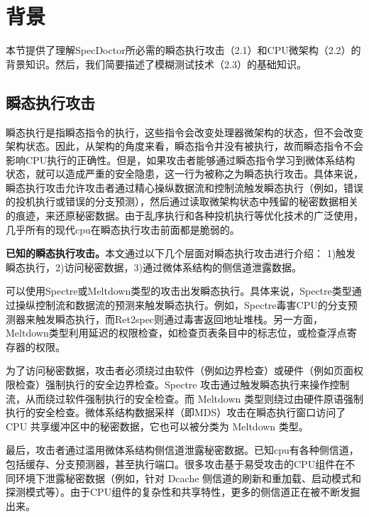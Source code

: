\section{背景}

本节提供了理解SpecDoctor所必需的瞬态执行攻击（2.1）和CPU微架构（2.2）的背景知识。然后，我们简要描述了模糊测试技术（2.3）的基础知识。

\subsection{瞬态执行攻击}

瞬态执行是指瞬态指令的执行，这些指令会改变处理器微架构的状态，但不会改变架构状态。因此，从架构的角度来看，瞬态指令并没有被执行，故而瞬态指令不会影响CPU执行的正确性。但是，如果攻击者能够通过瞬态指令学习到微体系结构状态，就可以造成严重的安全隐患，这一行为被称之为瞬态执行攻击。具体来说，瞬态执行攻击允许攻击者通过精心操纵数据流和控制流触发瞬态执行（例如，错误的投机执行或错误的分支预测），然后通过读取微架构状态中残留的秘密数据相关的痕迹，来还原秘密数据。由于乱序执行和各种投机执行等优化技术的广泛使用，几乎所有的现代cpu在瞬态执行攻击前面都是脆弱的。\par

\textbf{已知的瞬态执行攻击。}本文通过以下几个层面对瞬态执行攻击进行介绍： 1)触发瞬态执行，2)访问秘密数据，3)通过微体系结构的侧信道泄露数据。\par

可以使用Spectre或Meltdown类型的攻击出发瞬态执行。具体来说，Spectre类型通过操纵控制流和数据流的预测来触发瞬态执行。例如，Spectre毒害CPU的分支预测器来触发瞬态执行，而Ret2spec则通过毒害返回地址堆栈。另一方面，Meltdown类型利用延迟的权限检查，如检查页表条目中的标志位，或检查浮点寄存器的权限。\par

为了访问秘密数据，攻击者必须绕过由软件（例如边界检查）或硬件（例如页面权限检查）强制执行的安全边界检查。Spectre 攻击通过触发瞬态执行来操作控制流，从而绕过软件强制执行的安全检查。而 Meltdown 类型则绕过由硬件原语强制执行的安全检查。微体系结构数据采样（即MDS）攻击在瞬态执行窗口访问了 CPU 共享缓冲区中的秘密数据，它也可以被分类为 Meltdown 类型。\par

最后，攻击者通过滥用微体系结构侧信道泄露秘密数据。已知cpu有各种侧信道，包括缓存、分支预测器，甚至执行端口。很多攻击基于易受攻击的CPU组件在不同环境下泄露秘密数据（例如，针对 Dcache 侧信道的刷新和重加载、启动模式和探测模式等）。由于CPU组件的复杂性和共享特性，更多的侧信道正在被不断发掘出来。\par

